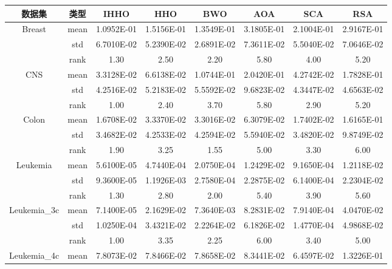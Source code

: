 \documentclass{wzuthesis}
\begin{document}
\begin{table}[htbp]
  \centering
  \footnotesize
    \begin{tabular}{cccccccc}
    \toprule
    数据集   & 类型    & IHHO  & HHO   & BWO   & AOA   & SCA   & RSA \\
    \midrule
    \multirow{3}[1]{*}{Breast} & mean  & 1.0952E-01 & 1.5156E-01 & 1.3549E-01 & 3.1805E-01 & 2.1004E-01 & 2.9167E-01 \\
          & std   & 6.7010E-02 & 5.2390E-02 & 2.6891E-02 & 7.3611E-02 & 5.5040E-02 & 7.0646E-02 \\
          & rank  & 1.30  & 2.50  & 2.20  & 5.80  & 4.00  & 5.20 \\
    \multirow{3}[0]{*}{CNS} & mean  & 3.3128E-02 & 6.6138E-02 & 1.0744E-01 & 2.0420E-01 & 4.2742E-02 & 1.7828E-01 \\
          & std   & 4.2516E-02 & 5.2183E-02 & 5.5592E-02 & 9.6823E-02 & 4.3447E-02 & 4.6563E-02 \\
          & rank  & 1.00  & 2.40  & 3.70  & 5.80  & 2.90  & 5.20 \\
    \multirow{3}[0]{*}{Colon} & mean  & 1.6708E-02 & 3.3370E-02 & 3.3016E-02 & 6.3079E-02 & 1.7402E-02 & 1.6165E-01 \\
          & std   & 3.4682E-02 & 4.2533E-02 & 4.2594E-02 & 5.5940E-02 & 3.4820E-02 & 9.8749E-02 \\
          & rank  & 1.90  & 3.25  & 1.55  & 5.00  & 3.30  & 6.00 \\
    \multirow{3}[0]{*}{Leukemia} & mean  & 5.6100E-05 & 4.7440E-04 & 2.0750E-04 & 1.2429E-02 & 9.1650E-04 & 1.2118E-02 \\
          & std   & 9.3600E-05 & 1.1926E-03 & 2.7580E-04 & 2.2875E-02 & 6.1400E-04 & 2.2304E-02 \\
          & rank  & 1.30  & 2.80  & 2.00  & 5.40  & 3.90  & 5.60 \\
    \multirow{3}[0]{*}{Leukemia\_3c} & mean  & 7.1400E-05 & 2.1629E-02 & 7.3640E-03 & 8.2831E-02 & 7.9140E-04 & 4.0470E-02 \\
          & std   & 1.0250E-04 & 3.4321E-02 & 2.2264E-02 & 6.1826E-02 & 1.4770E-04 & 4.9868E-02 \\
          & rank  & 1.00  & 3.35  & 2.25  & 6.00  & 3.40  & 5.00 \\
    \multirow{3}[0]{*}{Leukemia\_4c} & mean  & 7.8073E-02 & 7.8466E-02 & 7.8658E-02 & 8.3441E-02 & 6.4597E-02 & 1.3226E-01 \\

\end{tabular}
\end{table}
\end{document}
